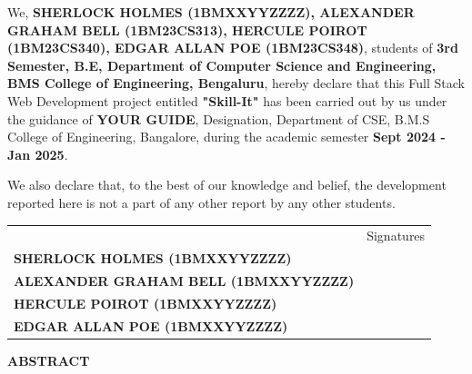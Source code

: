 \documentclass[a4paper,12pt]{article}
\begin{document}
    \begin{spacing}{1.25}
        
        \noindent
        \large We, \textbf{SHERLOCK HOLMES (1BMXXYYZZZZ), ALEXANDER GRAHAM BELL (1BM23CS313), HERCULE POIROT (1BM23CS340), EDGAR ALLAN POE (1BM23CS348)}, students of \textbf{3rd Semester, B.E, Department of Computer Science and Engineering, BMS College of Engineering, Bengaluru}, hereby declare that this Full Stack Web Development project entitled \textbf{"Skill-It"} has been carried out by us under the guidance of \textbf{YOUR GUIDE}, Designation, Department of CSE, B.M.S College of Engineering, Bangalore, during the academic semester \textbf{Sept 2024 - Jan 2025}.

        \noindent
        \Large We also declare that, to the best of our knowledge and belief, the development reported here is not a part of any other report by any other students.
        
        \vspace{1cm}
        \setlength\tabcolsep{0pt}
        \noindent
        \begingroup
        \fontsize{14pt}{12pt}
        \begin{tabulary}{0.95\linewidth}{LR}
            & Signatures \\
            \textbf{SHERLOCK HOLMES (1BMXXYYZZZZ)} & \\
            \textbf{ALEXANDER GRAHAM BELL (1BMXXYYZZZZ)} & \\
            \textbf{HERCULE POIROT (1BMXXYYZZZZ)} & \\
            \textbf{EDGAR ALLAN POE (1BMXXYYZZZZ)} & \\
        \end{tabulary}
        \endgroup
    \end{spacing}
\clearpage
    \begin{center}
    \Large \textbf{ABSTRACT}
    \end{center}
    \begin{spacing}{2.0}
        \lipsum[0-5]
    \end{spacing}
        
\end{document}
